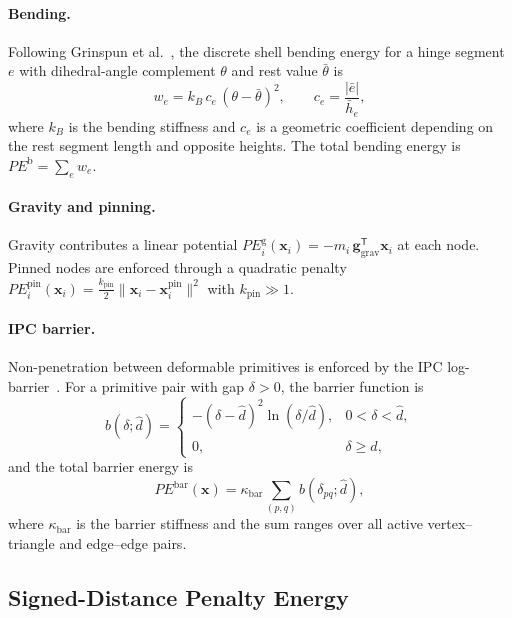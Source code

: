 \documentclass[acmtog,anonymous,review]{acmart}
\begin{document}
\paragraph{Bending.}
Following Grinspun et al.~\cite{grinspun2003discrete}, the discrete
shell bending energy for a hinge segment $e$ with dihedral-angle
complement $\theta$ and rest value $\bar{\theta}$ is
\begin{equation}
\label{eq:bending_energy}
w_e = k_B\,c_e\,(\theta - \bar{\theta})^2,
\qquad
c_e = \frac{|\bar{e}|}{\bar{h}_e},
\end{equation}
where $k_B$ is the bending stiffness and $c_e$ is a geometric
coefficient depending on the rest segment length and opposite heights.
The total bending energy is $PE^{\mathrm{b}}=\sum_e w_e$.

\paragraph{Gravity and pinning.}
Gravity contributes a linear potential
$PE_i^{\mathrm{g}}(\mathbf{x}_i)
=-m_i\,\mathbf{g}_{\mathrm{grav}}^{\mathsf T}\mathbf{x}_i$
at each node. Pinned nodes are enforced through a quadratic penalty
$PE_i^{\mathrm{pin}}(\mathbf{x}_i)
=\tfrac{k_{\mathrm{pin}}}{2}
\|\mathbf{x}_i-\mathbf{x}_i^{\mathrm{pin}}\|^2$
with $k_{\mathrm{pin}}\gg 1$.

\paragraph{IPC barrier.}
Non-penetration between deformable primitives is enforced by the IPC
log-barrier~\cite{li2020ipc}. For a primitive pair with gap
$\delta>0$, the barrier function is
\begin{equation}
\label{eq:barrier}
b(\delta;\hat{d})
=
\begin{cases}
-(\delta-\hat{d})^2\ln(\delta/\hat{d}), & 0<\delta<\hat{d},\\
0, & \delta\ge\hat{d},
\end{cases}
\end{equation}
and the total barrier energy is
\begin{equation}
\label{eq:barrier_energy}
PE^{\mathrm{bar}}(\mathbf{x}) = \kappa_{\mathrm{bar}} \sum_{(p,q)} b(\delta_{pq};\hat{d}),
\end{equation}
where $\kappa_{\mathrm{bar}}$ is the barrier stiffness and the sum
ranges over all active vertex--triangle and edge--edge pairs.

\subsection{Signed-Distance Penalty Energy}
\end{document}
